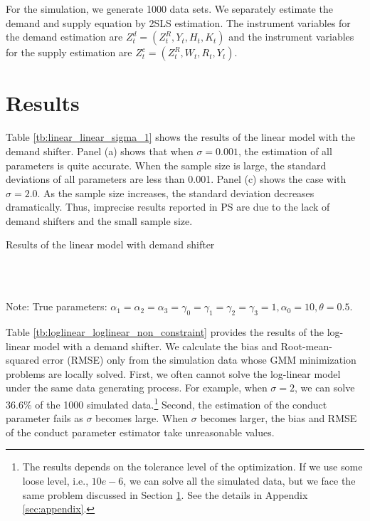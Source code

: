\documentclass[11pt, a4paper]{article}
\begin{document}
For the simulation, we generate 1000 data sets.
We separately estimate the demand and supply equation by 2SLS estimation.
The instrument variables for the demand estimation are $Z^{d}_{t} = (Z^{R}_{t}, Y_t, H_{t}, K_{t})$ and the instrument variables for the supply estimation are $Z^{c}_{t} = (Z^{R}_{t}, W_{t}, R_t, Y_t)$. 


\section{Results}\label{sec:results}

Table \ref{tb:linear_linear_sigma_1} shows the results of the linear model with the demand shifter.
Panel (a) shows that when $\sigma = 0.001$, the estimation of all parameters is quite accurate.
When the sample size is large, the standard deviations of all parameters are less than 0.001. 
Panel (c) shows the case with $\sigma = 2.0$. As the sample size increases, the standard deviation decreases dramatically. 
Thus, imprecise results reported in PS are due to the lack of demand shifters and the small sample size.



\begin{table}[!htbp]
  \begin{center}
      \caption{Results of the linear model with demand shifter}
      \label{tb:linear_linear_sigma_1} 
      \subfloat[$\sigma=0.001$]{}\\
      \subfloat[$\sigma=0.5$]{}\\
    \subfloat[$\sigma=2.0$]{}
  \end{center}\footnotesize
  Note: True parameters: $\alpha_1 = \alpha_2 = \alpha_3 = \gamma_0 = \gamma_1 = \gamma_2  = \gamma_3 = 1, \alpha_0 = 10, \theta = 0.5.$
\end{table} 

Table \ref{tb:loglinear_loglinear_non_constraint} provides the results of the log-linear model with a demand shifter.
We calculate the bias and Root-mean-squared error (RMSE) only from the simulation data whose GMM minimization problems are locally solved. 
First, we often cannot solve the log-linear model under the same data generating process. For example, when $\sigma=2$, we can solve 36.6\% of the 1000 simulated data.\footnote{The results depends on the tolerance level of the optimization. If we use some loose level, i.e., $10e-6$, we can solve all the simulated data, but we face the same problem discussed in Section \ref{sec:results}. See the details in Appendix \ref{sec:appendix}.}
Second, the estimation of the conduct parameter fails as $\sigma$ becomes large. 
When $\sigma$ becomes larger, the bias and RMSE of the conduct parameter estimator take unreasonable values.
\end{document}
